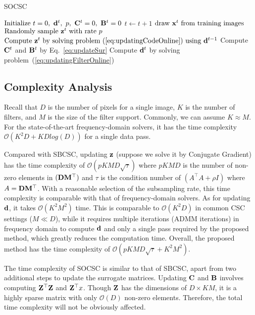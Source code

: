 \begin{algorithm}[H]
\caption{SOCSC} \label{algo:SOCSC}
\begin{algorithmic}[1]
\State $\text{Initialize} ~ t=0, ~\filter^t, ~p, ~\surC^t = 0, ~\surB^t = 0$
    \State $t \gets t+1$
    \State $ \text{draw } \signal^t \text{ from training images} $
    \State $ \text{Randomly sample }\code^t \text{ with rate } p $
    \State $ \text{Compute } \code^t \text{ by solving problem~(\ref{eq:updatingCodeOnline}) using } \filter^{t-1}$
    \State Compute $\surC^t$ and $\surB^t$ by Eq.~\ref{eq:updateSur}
    \State Compute $\filter^t$ by solving problem~(\ref{eq:updatingFilterOnline})
\EndWhile
\end{algorithmic}
\end{algorithm}

\subsection{Complexity Analysis}
Recall that $D$ is the number of pixels for a single image, $K$ is the number of filters, and $M$ is the size of the filter support. Commonly, we can assume
$K \approx M$. For the state-of-the-art frequency-domain solvers, it has the time complexity $\mathcal{O}(K^2D + KDlog(D))$ for a single data pass. 

Compared with SBCSC, updating $\code$ (suppose we solve it by Conjugate Gradient) has the time complexity of $\mathcal{O}(pKMD \sqrt{\tau})$ where $pKMD$ is the number of non-zero elements in $(\Filter \mask^\top)$ and $\tau$ is the condition number of $(A^\top A + \rho I)$ where $A = \Filter \mask^\top$. With a reasonable selection of the subsampling rate, this time complexity is comparable with that of frequency-domain solvers. As for updating $\filter$, it takes $\mathcal{O}(K^2M^2)$ time. This is comparable to $\mathcal{O}(K^2D)$ in common CSC settings ($M \ll D$), while it requires multiple iterations (ADMM iterations) in frequency domain to compute $\filter$ and only a single pass required by the proposed method, which greatly reduces the computation time. Overall, the proposed method has the time complexity of $\mathcal{O}(pKMD \sqrt{\tau} + K^2M^2)$.

The time complexity of SOCSC is similar to that of SBCSC, apart from two additional steps to update the surrogate matrices. Updating $\surC$ and $\surB$ involves computing $\Code^\top\Code$ and $\Code^\top x$. Though $\Code$ has the dimensions of $D \times KM$, it is a highly sparse matrix with only $\mathcal{O}(D)$ non-zero elements. Therefore, the total time complexity will not be obviously affected. 